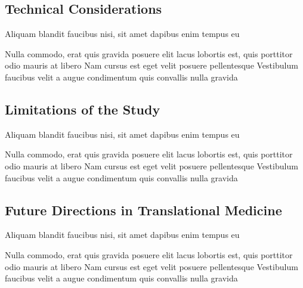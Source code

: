 \documentclass[
paper=landscape,
paper=160mm:90mm, %
fontsize=11pt, %
pagesize, %
parskip=half-, %
]{scrartcl} %
\theoremstyle{mythmstyle} %
\begin{document}
\clearpage

\subsection{Technical Considerations}

\begin{outline}

\1 Aliquam blandit faucibus nisi, sit amet dapibus enim tempus eu

\2 Nulla commodo, erat quis gravida posuere
\1 elit lacus lobortis est, quis porttitor odio mauris at libero
\1 Nam cursus est eget velit posuere pellentesque
\1 Vestibulum faucibus velit a augue condimentum quis convallis nulla gravida

\end{outline}


\clearpage

\subsection{Limitations of the Study}


\begin{outline}

\1 Aliquam blandit faucibus nisi, sit amet dapibus enim tempus eu

\2 Nulla commodo, erat quis gravida posuere
\1 elit lacus lobortis est, quis porttitor odio mauris at libero
\1 Nam cursus est eget velit posuere pellentesque
\1 Vestibulum faucibus velit a augue condimentum quis convallis nulla gravida

\end{outline}


\clearpage

\subsection{Future Directions in Translational Medicine}

\begin{outline}

\1 Aliquam blandit faucibus nisi, sit amet dapibus enim tempus eu

\2 Nulla commodo, erat quis gravida posuere
\1 elit lacus lobortis est, quis porttitor odio mauris at libero
\1 Nam cursus est eget velit posuere pellentesque
\1 Vestibulum faucibus velit a augue condimentum quis convallis nulla gravida

\end{outline}
\end{document}
